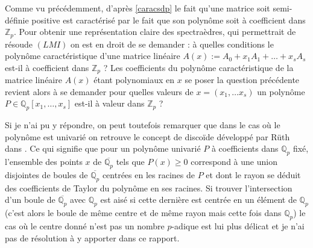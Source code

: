 Comme vu précédemment, d'après \ref{caracsdp} le fait qu'une matrice soit semi-définie positive est caractérisé par le fait que son polynôme soit à coefficient dans $\mathbb{Z}_p$. Pour obtenir une représentation claire des spectraèdres, qui permettrait de résoude $(LMI)$ on est en droit de se demander : à quelles conditions le polynôme caractéristique d'une matrice linéaire $A(x) := A_0 + x_1 A_1 + \ldots + x_s A_s$ est-il à coefficient dans $\mathbb{Z}_p$ ? 
Les coefficients du polynôme caractéristique de la matrice linéaire $A(x)$ étant polynomiaux en $x$ se poser la question précédente revient alors à se demander pour quelles valeurs de $x = (x_1,\ldots x_s)$ un polynôme $P \in \mathbb{Q}_{p} [x_1,\ldots,x_s]$ est-il à valeur dans $\mathbb{Z}_p$ ? 

Si je n'ai pu y répondre, on peut toutefois remarquer que dans le cas où le polynôme est univarié on retrouve le concept de discoïde développé par Rüth dans \cite{ruth_models_2015}. Ce qui signifie que pour un polynôme univarié $P$ à coefficients dans $\mathbb{Q}_{p}$ fixé, l'ensemble des points $x$ de $ \overline{\mathbb{Q}_{p} }$ tels que $P(x)\ge 0$ correspond à une union disjointes de boules de $\overline{\mathbb{Q}_{p} }$ centrées en les racines de $P$ et dont le rayon se déduit des coefficients de Taylor du polynôme en ses racines. Si trouver l'intersection d'un boule de $\overline{\mathbb{Q}_{p} }$ avec $\mathbb{Q}_{p}$ est aisé si cette dernière est centrée en un élément de $\mathbb{Q}_{p}$ (c'est alors le boule de même centre et de même rayon mais cette fois dans $\mathbb{Q}_{p}$) le cas où le centre donné n'est pas un nombre $p$-adique est lui plus délicat et je n'ai pas de résolution à y apporter dans ce rapport. 

